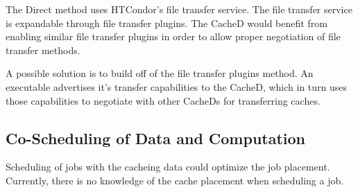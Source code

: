 The Direct method uses HTCondor's file transfer service.  The file transfer service is expandable through file transfer plugins.  The CacheD would benefit from enabling similar file transfer plugins in order to allow proper negotiation of file transfer methods.

A possible solution is to build off of the file transfer plugins method.  An executable advertises it's transfer capabilities to the CacheD, which in turn uses those capabilities to negotiate with other CacheDs for transferring caches.


\subsection{Co-Scheduling of Data and Computation}

Scheduling of jobs with the cacheing data could optimize the job placement.  Currently, there is no knowledge of the cache placement when scheduling a job.








